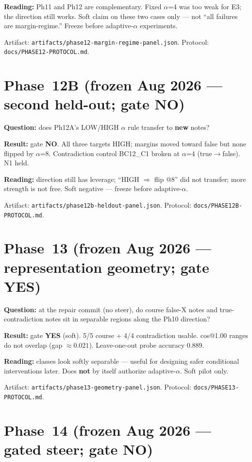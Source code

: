 \documentclass[11pt,a4paper]{article}
\begin{document}
\textbf{Reading:} Ph11 and Ph12 are complementary. Fixed $\alpha$=4 was too weak for E3; the direction still works. Soft claim on these two cases only --- not ``all failures are margin-regime.'' Freeze before adaptive-$\alpha$ experiments.

Artifact: \texttt{artifacts/phase12-margin-regime-panel.json}. Protocol: \texttt{docs/PHASE12-PROTOCOL.md}.

\section{Phase~12B (frozen Aug 2026 --- second held-out; gate NO)}

\textbf{Question:} does Ph12A's LOW/HIGH $\alpha$ rule transfer to \textbf{new} notes?

\textbf{Result:} gate \textbf{NO}. All three targets HIGH; margins moved toward false but none flipped by $\alpha$=8. Contradiction control BC12\_C1 broken at $\alpha$=4 (true$\rightarrow$false). N1 held.

\textbf{Reading:} direction still has leverage; ``HIGH $\Rightarrow$ flip @8'' did not transfer; more strength is not free. Soft negative --- freeze before adaptive-$\alpha$.

Artifact: \texttt{artifacts/phase12b-heldout-panel.json}. Protocol: \texttt{docs/PHASE12B-PROTOCOL.md}.

\section{Phase~13 (frozen Aug 2026 --- representation geometry; gate YES)}

\textbf{Question:} at the repair commit (no steer), do course false-X notes and true-contradiction notes sit in separable regions along the Ph10 direction?

\textbf{Result:} gate \textbf{YES} (soft). 5/5 course + 4/4 contradiction usable. cos@1.00 ranges do not overlap (gap $\approx 0.021$). Leave-one-out probe accuracy $0.889$.

\textbf{Reading:} classes look softly separable --- useful for designing safer conditional interventions later. Does \textbf{not} by itself authorize adaptive-$\alpha$. Soft pilot only.

Artifact: \texttt{artifacts/phase13-geometry-panel.json}. Protocol: \texttt{docs/PHASE13-PROTOCOL.md}.

\section{Phase~14 (frozen Aug 2026 --- gated steer; gate NO)}
\end{document}
